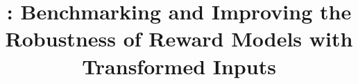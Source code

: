 \title{\benchmark: Benchmarking and Improving the Robustness of Reward Models with Transformed Inputs}
